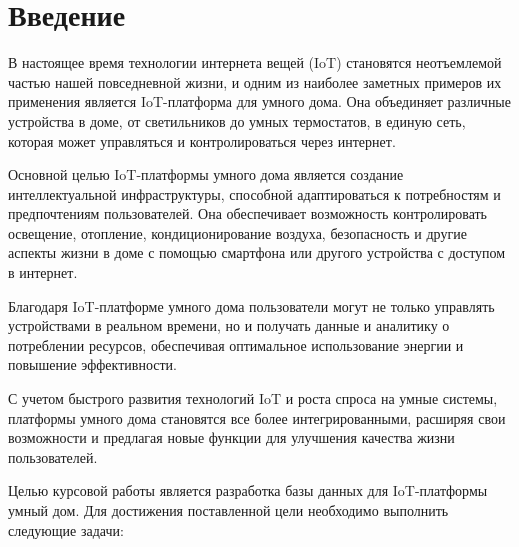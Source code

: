\chapter*{Введение}

В настоящее время технологии интернета вещей (IoT) становятся 
неотъемлемой частью нашей повседневной жизни, и одним из наиболее 
заметных примеров их применения является IoT-платформа для умного дома. 
Она объединяет различные устройства в доме, от 
светильников до умных термостатов, в единую сеть, которая может 
управляться и контролироваться через интернет.

Основной целью IoT-платформы умного дома является создание 
интеллектуальной инфраструктуры, способной адаптироваться к 
потребностям и предпочтениям пользователей. Она обеспечивает 
возможность контролировать освещение, отопление, кондиционирование 
воздуха, безопасность и другие аспекты жизни в доме с помощью смартфона 
или другого устройства с доступом в интернет.

Благодаря IoT-платформе умного дома пользователи могут не только 
управлять устройствами в реальном времени, но и получать данные и 
аналитику о потреблении ресурсов, обеспечивая оптимальное использование 
энергии и повышение эффективности.

С учетом быстрого развития технологий IoT и роста спроса на умные 
системы, платформы умного дома становятся все более интегрированными, 
расширяя свои возможности и предлагая новые функции для улучшения 
качества жизни пользователей.

Целью курсовой работы является разработка базы данных для IoT-платформы умный дом. 
Для достижения поставленной цели необходимо выполнить следующие задачи:

